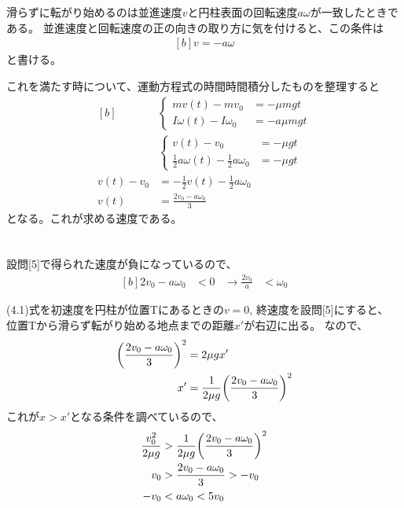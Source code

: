 \documentclass[../ap_2013.tex]{subfiles}
\begin{document}
\section{}
滑らずに転がり始めるのは並進速度\(v\)と円柱表面の回転速度\(a\omega\)が一致したときである。
並進速度と回転速度の正の向きの取り方に気を付けると、この条件は
\begin{equation}\begin{aligned}[b]
    v=-a\omega
\end{aligned}\end{equation}
と書ける。

これを満たす時について、運動方程式の時間時間積分したものを整理すると
\begin{equation}\begin{aligned}[b]
    &\begin{cases}
        mv(t) -mv_0 &= -\mu mgt\\
        I\omega(t) -I\omega_0 &= -a\mu mgt
    \end{cases}\\
    &\begin{cases}
        v(t) -v_0 &= -\mu gt\\
        \frac{1}{2}a\omega(t) -\frac{1}{2}a\omega_0 &= -\mu gt
    \end{cases}\\
    v(t)-v_0 &= -\frac{1}{2}v(t)-\frac{1}{2}a\omega_0\\
    v(t) &= \frac{2v_0-a\omega_0}{3}
\end{aligned}\end{equation}
となる。これが求める速度である。


\section{}
設問[5]で得られた速度が負になっているので、
\begin{equation}\begin{aligned}[b]
    2v_0-a\omega_0 &< 0 &\rightarrow
    \frac{2v_0}{a} &<\omega_0
\end{aligned}\end{equation}

(4.1)式を初速度を円柱が位置Tにあるときの\(v=0\), 終速度を設問[5]にすると、
位置Tから滑らず転がり始める地点までの距離\(x'\)が右辺に出る。
なので、
\begin{equation}\begin{aligned}[b]
    \qty(\frac{2v_0-a\omega_0}{3})^2&=2\mu gx'\\
    x' &= \frac{1}{2\mu g}\qty(\frac{2v_0-a\omega_0}{3})^2
\end{aligned}\end{equation}
これが\(x>x'\)となる条件を調べているので、
\begin{equation}\begin{aligned}[b]
    \frac{v_0^2}{2\mu g} &> \frac{1}{2\mu g}\qty(\frac{2v_0-a\omega_0}{3})^2\\
    v_0 &> \frac{2v_0-a\omega_0}{3} > -v_0\\
    -v_0 &< a\omega_0 < 5v_0
\end{aligned}\end{equation}
\end{document}
